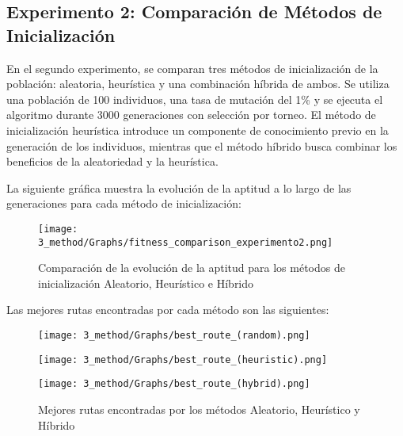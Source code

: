 \subsection{Experimento 2: Comparación de Métodos de Inicialización} 
En el segundo experimento, se comparan tres métodos de inicialización de la población: aleatoria, heurística y una combinación híbrida de ambos. Se utiliza una población de 100 individuos, una tasa de mutación del 1\% y se ejecuta el algoritmo durante 3000 generaciones con selección por torneo. El método de inicialización heurística introduce un componente de conocimiento previo en la generación de los individuos, mientras que el método híbrido busca combinar los beneficios de la aleatoriedad y la heurística. 

La siguiente gráfica muestra la evolución de la aptitud a lo largo de las generaciones para cada método de inicialización:

\begin{figure}[H]
  \centering
  \caption{Comparación de la evolución de la aptitud para los métodos de inicialización Aleatorio, Heurístico e Híbrido}
  \texttt{[image: 3\_method/Graphs/fitness\_comparison\_experimento2.png]}
\end{figure}

Las mejores rutas encontradas por cada método son las siguientes:


\begin{figure}[H]
  \centering
  \caption{Mejores rutas encontradas por los métodos Aleatorio, Heurístico y Híbrido}
  \begin{minipage}{0.32\textwidth}
    \centering
    \texttt{[image: 3\_method/Graphs/best\_route\_(random).png]}
  \end{minipage}\hfill
  \begin{minipage}{0.32\textwidth}
    \centering
    \texttt{[image: 3\_method/Graphs/best\_route\_(heuristic).png]}
  \end{minipage}\hfill
  \begin{minipage}{0.32\textwidth}
    \centering
    \texttt{[image: 3\_method/Graphs/best\_route\_(hybrid).png]}
  \end{minipage}
\end{figure}
